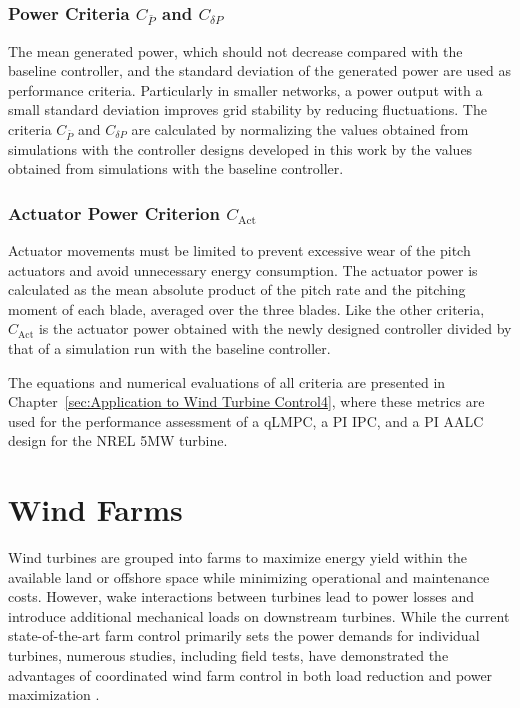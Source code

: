 \subsubsection{Power Criteria $C_{\bar{P}}$ and $C_{\delta P}$}
The mean generated power, which should not decrease compared with the baseline controller, and the standard deviation of the generated power are used as performance criteria. Particularly in smaller networks, a power output with a small standard deviation improves grid stability by reducing fluctuations. The criteria $C_{\bar{P}}$ and $C_{\delta P}$ are calculated by normalizing the values obtained from simulations with the controller designs developed in this work by the values obtained from simulations with the baseline controller.

\subsubsection{Actuator Power Criterion $C_{\text{Act}}$}
Actuator movements must be limited to prevent excessive wear of the pitch actuators and avoid unnecessary energy consumption. The actuator power is calculated as the mean absolute product of the pitch rate and the pitching moment of each blade, averaged over the three blades. Like the other criteria, $C_{\text{Act}}$ is the actuator power obtained with the newly designed controller divided by that of a simulation run with the baseline controller.

The equations and numerical evaluations of all criteria are presented in Chapter~\ref{sec:Application to Wind Turbine Control4}, where these metrics are used for the performance assessment of a qLMPC, a PI IPC, and a PI AALC design for the NREL 5MW turbine.


\section{Wind Farms}\label{sec:WakeModels}

Wind turbines are grouped into farms to maximize energy yield within the available land or offshore space while minimizing operational and maintenance costs. However, wake interactions between turbines lead to power losses and introduce additional mechanical loads on downstream turbines. While the current state-of-the-art farm control primarily sets the power demands for individual turbines, numerous studies, including field tests, have demonstrated the advantages of coordinated wind farm control in both load reduction and power maximization \cite{houck2022review}.

